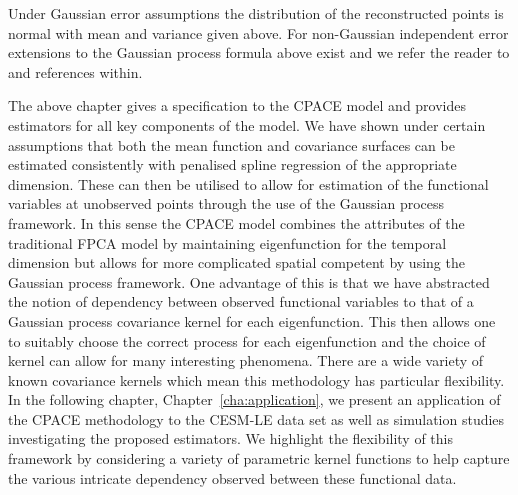 Under Gaussian error assumptions the distribution of the reconstructed points is normal with mean and variance given above.
For non-Gaussian independent error extensions to the Gaussian process formula above exist and we refer the reader to \citep[Ch.~9]{williams_gaussian_2006} and references within.

The above chapter gives a specification to the CPACE model and provides estimators for all key components of the model.
We have shown under certain assumptions that both the mean function and covariance surfaces can be estimated consistently with penalised spline regression of the appropriate dimension.
These can then be utilised to allow for estimation of the functional variables at unobserved points through the use of the Gaussian process framework.
In this sense the CPACE model combines the attributes of the traditional FPCA model by maintaining eigenfunction for the temporal dimension but allows for more complicated spatial competent by using the Gaussian process framework. 
One advantage of this is that we have abstracted the notion of dependency between observed functional variables to that of a Gaussian process covariance kernel for each eigenfunction.
This then allows one to suitably choose the correct process for each eigenfunction and the choice of kernel can allow for many interesting phenomena.
There are a wide variety of known covariance kernels which mean this methodology has particular flexibility.
In the following chapter, Chapter~\ref{cha:application}, we present an application of the CPACE methodology to the CESM-LE data set as well as simulation studies investigating the proposed estimators.
We highlight the flexibility of this framework by considering a variety of parametric kernel functions to help capture the various intricate dependency observed between these functional data.